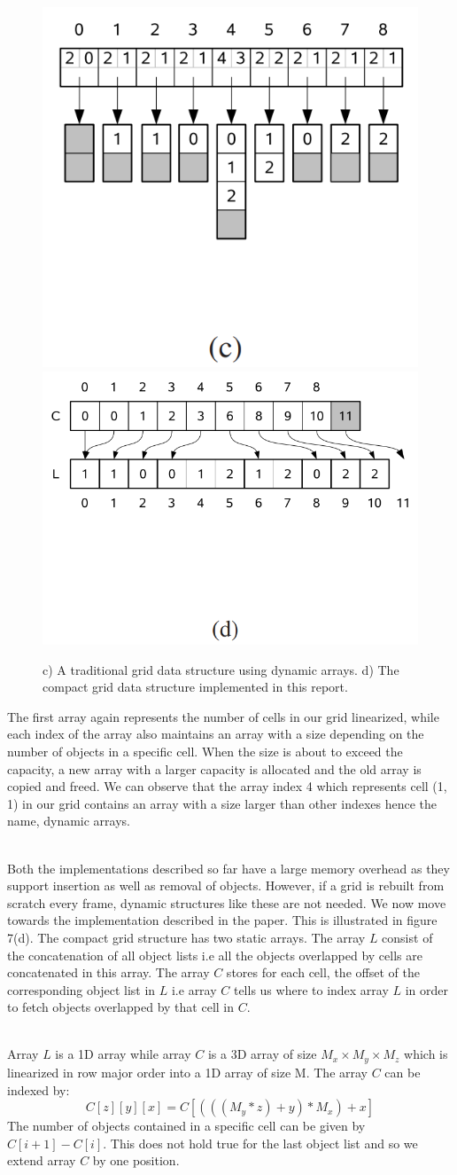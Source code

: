 \documentclass[11pt,a4paper]{article}
\begin{document}
\begin{figure}[H]
	\centering
	\captionsetup{justification=centering}
	\includegraphics[width=.3\textwidth]{uniformgrids3}\quad
	\includegraphics[width=.3\textwidth]{uniformgrids4}\quad
	\caption{c) A traditional grid data structure using dynamic arrays. d) The compact grid data structure implemented in this report.
 \protect\cite{lagae2008compact}}
\end{figure}
The first array again represents the number of cells in our grid linearized, while each index of the array also maintains an array with a size depending on the number of objects in a specific cell. When the size is about to exceed the capacity, a new array with a larger capacity is allocated and the old array is copied and freed. We can observe that the array index 4 which represents cell (1, 1) in our grid contains an array with a size larger than other indexes hence the name, dynamic arrays.

\noindent
\\
Both the implementations described so far have a large memory overhead as they support insertion as well as removal of objects. However, if a grid is rebuilt from scratch every frame, dynamic structures like these are not needed. We now move towards the implementation described in the paper. This is illustrated in figure 7(d). The compact grid structure has two static arrays. The array $L$ consist of the concatenation of all object lists i.e all the objects overlapped by cells are concatenated in this array. The array $C$ stores for each cell, the offset of the corresponding object list in $L$ i.e array $C$ tells us where to index array $L$ in order to fetch objects overlapped by that cell in $C$.

\noindent
\\
Array $L$ is a 1D array while array $C$ is a 3D array of size $M_{x} \times M_{y} \times M_{z}$ which is linearized in row major order into a 1D array of size M. The array $C$ can be indexed by:
\begin{equation}
C[z][y][x] = C[(((M_{y} * z) + y) * M_{x}) + x]
\end{equation}
The number of objects contained in a specific cell can be given by $C[i+1] - C[i]$. This does not hold true for the last object list and so we extend array $C$ by one position.
\\
\noindent
\end{document}
